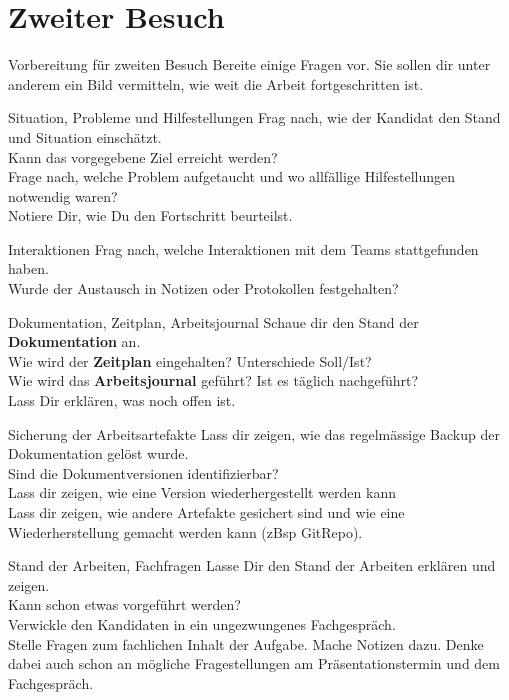 \section{Zweiter Besuch}
\begin{taskitem}{Vorbereitung für zweiten Besuch}
  Bereite einige Fragen vor. Sie sollen dir unter anderem ein Bild vermitteln, wie weit die Arbeit fortgeschritten ist.
\end{taskitem}
\begin{taskitem}{Situation, Probleme und Hilfestellungen}
  Frag nach, wie der Kandidat den Stand und Situation einschätzt.\\Kann das vorgegebene Ziel erreicht werden?\\Frage nach, welche Problem aufgetaucht und wo allfällige Hilfestellungen notwendig waren?\\Notiere Dir, wie Du den Fortschritt beurteilst.
\end{taskitem}
\begin{taskitem}{Interaktionen}
  Frag nach, welche Interaktionen mit dem Teams stattgefunden haben.\\Wurde der Austausch in Notizen oder Protokollen festgehalten?
\end{taskitem}
\newpage
\begin{taskitem}{Dokumentation, Zeitplan, Arbeitsjournal}
  Schaue dir den Stand der \textbf{Dokumentation} an.\\
  Wie wird der \textbf{Zeitplan} eingehalten? Unterschiede Soll/Ist?\\Wie wird das \textbf{Arbeitsjournal} geführt? Ist es täglich nachgeführt?\\Lass Dir erklären, was noch offen ist.
\end{taskitem}
\begin{taskitem}{Sicherung der Arbeitsartefakte}
  Lass dir zeigen, wie das regelmässige Backup der Dokumentation gelöst wurde.\\Sind die Dokumentversionen identifizierbar?\\Lass dir zeigen, wie eine Version wiederhergestellt werden kann\\Lass dir zeigen, wie andere Artefakte gesichert sind und wie eine Wiederherstellung gemacht werden kann (zBsp GitRepo).
\end{taskitem}
\begin{taskitem}{Stand der Arbeiten, Fachfragen}
  Lasse Dir den Stand der Arbeiten erklären und zeigen.\\Kann schon etwas vorgeführt werden?\\Verwickle den Kandidaten in ein ungezwungenes Fachgespräch.\\Stelle Fragen zum fachlichen Inhalt der Aufgabe. Mache Notizen dazu. Denke dabei auch schon an mögliche Fragestellungen am Präsentationstermin und dem Fachgespräch.
\end{taskitem}
